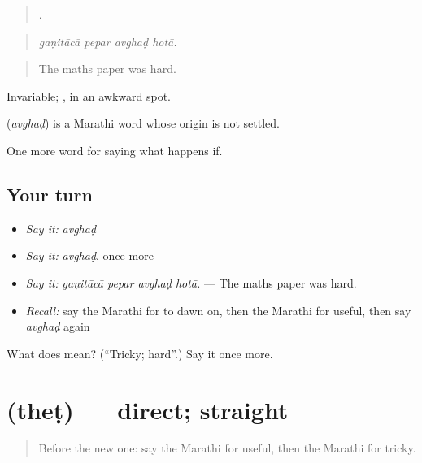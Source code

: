 \begin{quote}
   .
\end{quote}

\begin{quote}
\emph{gaṇitācā pepar avghaḍ hotā.}
\end{quote}

\begin{quote}
The maths paper was hard.
\end{quote}

Invariable;  , in an awkward spot.

\begin{cousinweb}
\textbf{} (\emph{avghaḍ}) is a Marathi word whose origin is not settled.
\end{cousinweb}

\begin{grammarlens}[title={What you've built}]
One more word for saying what happens if.
\end{grammarlens}

\subsection*{Your turn}
\begin{itemize}
\raggedright
  \item \emph{Say it:} \emph{avghaḍ}
  \item \emph{Say it:} \emph{avghaḍ}, once more
  \item \emph{Say it:} \emph{gaṇitācā pepar avghaḍ hotā.} — The maths paper was hard.
  \item \emph{Recall:} say the Marathi for to dawn on, then the Marathi for useful, then say \emph{avghaḍ} again
\end{itemize}

\begin{tcolorbox}[breakable,colback=teal!4,colframe=teal!35!black,title={Before you move on}]
What does  mean? (\textquotedblleft{}Tricky; hard\textquotedblright{}.) Say it once more.
\end{tcolorbox}
\section[\texorpdfstring{\mr{थेट} (theṭ)}{थेट (theṭ)}]{ (theṭ) — direct; straight}

\label{lesson:MR-C395-thet}



\begin{quote}
Before the new one: say the Marathi for useful, then the Marathi for tricky.
\end{quote}

